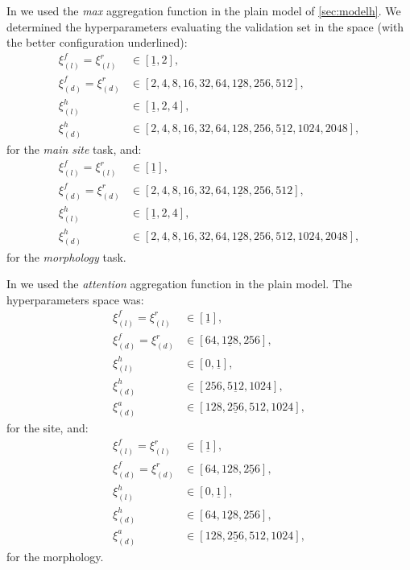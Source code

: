 In \maxp{} we used the \emph{max} aggregation
function 
in the plain model of \cref{sec:modelh}. We determined the
hyperparameters evaluating the validation set in the space (with the
better configuration underlined):
\begin{align*}
  \xi_{(l)}^f=\xi_{(l)}^r&\in[\underline{1},2],\\
  \xi_{(d)}^f=\xi_{(d)}^r&\in[2,4,8,16,32,64,\underline{128},256,512],\\
  \xi_{(l)}^h&\in[\underline{1},2,4],\\
  \xi_{(d)}^h&\in[2,4,8,16,32,64,128,256,\underline{512},1024,2048],
\end{align*}
for the \emph{main site} task, and:
\begin{align*}
  \xi_{(l)}^f=\xi_{(l)}^r&\in[\underline{1}],\\
  \xi_{(d)}^f=\xi_{(d)}^r&\in[2,4,8,16,32,64,\underline{128},256,512],\\
  \xi_{(l)}^h&\in[\underline{1},2,4],\\
  \xi_{(d)}^h&\in[2,4,8,16,32,64,\underline{128},256,512,1024,2048],
\end{align*}
for the \emph{morphology} task.

In \softmax{} we used the \emph{attention} aggregation function in the
plain model. The hyperparameters
space was:
\begin{align*}
  \xi_{(l)}^f=\xi_{(l)}^r&\in[\underline{1}],\\
  \xi_{(d)}^f=\xi_{(d)}^r&\in[64,\underline{128},256],\\
  \xi_{(l)}^h&\in[0,\underline{1}],\\
  \xi_{(d)}^h&\in[256,\underline{512},1024],\\
  \xi_{(d)}^a&\in[128,\underline{256},512,1024],
\end{align*}
for the site, and:
\begin{align*}
  \xi_{(l)}^f=\xi_{(l)}^r&\in[\underline{1}],\\
  \xi_{(d)}^f=\xi_{(d)}^r&\in[64,128,\underline{256}],\\
  \xi_{(l)}^h&\in[0,\underline{1}],\\
  \xi_{(d)}^h&\in[64,\underline{128},256],\\
  \xi_{(d)}^a&\in[128,\underline{256},512,1024],
\end{align*}
for the morphology.

